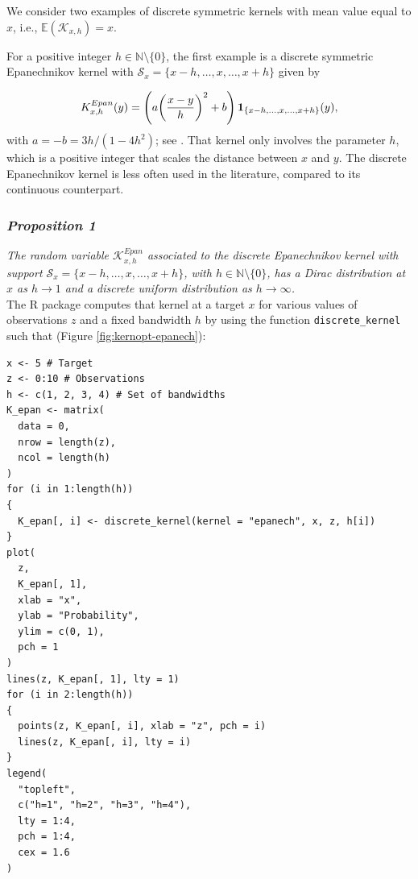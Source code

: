 We consider two examples of discrete symmetric kernels with mean value equal to \(x\), i.e., \(\mathbb{E}(\mathcal{K}_{x,h}) =x\).

For a positive integer \(h\in\mathbb{N}\setminus\{0\}\), the first example is a discrete symmetric Epanechnikov kernel with \(\mathcal{S}_{x}=\{x-h,\ldots,x,\ldots,x+h\}\) given by

\begin{equation*}  
K^{Epan}_{x,h}(y)= \left(a\bigg(\frac{x-y}{h}\bigg)^{2} + b\right){\bf 1}_{\{x-h,\ldots,x,\ldots,x+h\}}(y),
\end{equation*}
with \(a=-b=3h/(1-4h^{2})\); see \citet{chu2017}. That kernel only involves the parameter \(h\), which is a positive integer that scales the distance between \(x\) and \(y\). The discrete Epanechnikov kernel is less often used in the literature, compared to its continuous counterpart.

\subsubsection{\texorpdfstring{\emph{Proposition 1}}{Proposition 1}}\label{proposition-1}

\emph{
The random variable \(\mathcal{K}^{Epan}_{x,h}\) associated to the discrete Epanechnikov kernel with support \(\mathcal{S}_{x}=\{x-h,\ldots,x,\ldots,x+h\}\), with \(h\in\mathbb{N}\setminus\{0\}\), has a Dirac distribution at \(x\) as \(h\to 1\) and a discrete uniform distribution as \(h\to \infty\).
}\\

The  R package computes that kernel at a target \(x\) for various values of observations \(z\) and a fixed bandwidth \(h\) by using the function \texttt{discrete\_kernel} such that (Figure \ref{fig:kernopt-epanech}):

\begin{verbatim}
x <- 5 # Target
z <- 0:10 # Observations
h <- c(1, 2, 3, 4) # Set of bandwidths
K_epan <- matrix(
  data = 0,
  nrow = length(z),
  ncol = length(h)
)
for (i in 1:length(h))
{
  K_epan[, i] <- discrete_kernel(kernel = "epanech", x, z, h[i])
}
plot(
  z,
  K_epan[, 1],
  xlab = "x",
  ylab = "Probability",
  ylim = c(0, 1),
  pch = 1
)
lines(z, K_epan[, 1], lty = 1)
for (i in 2:length(h))
{
  points(z, K_epan[, i], xlab = "z", pch = i)
  lines(z, K_epan[, i], lty = i)
}
legend(
  "topleft",
  c("h=1", "h=2", "h=3", "h=4"),
  lty = 1:4,
  pch = 1:4,
  cex = 1.6
)
\end{verbatim}

